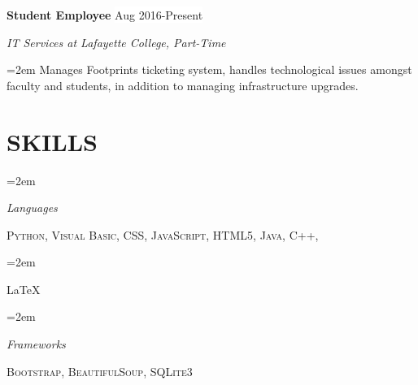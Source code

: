 \documentclass[paper=letter,fontsize=11pt]{scrartcl} %
\newlength{\spacebox}
\newcommand{\NewPart}[1]{\section*{\uppercase{#1}}}
\newcommand{\PersonalEntry}[2]{
		\noindent\hangindent=2em\hangafter=0 %
		\parbox{\spacebox}{        %
		\textit{#1}}		       %
		\hspace{1.5em} #2 \par}    %
\newcommand{\SkillsEntry}[2]{      %
		\noindent\hangindent=2em\hangafter=0 %
		\parbox{\spacebox}{        %
		\textit{#1}}			   %
		\hspace{1.5em} #2 \par}    %
\newcommand{\EducationEntry}[4]{
		\noindent \textbf{#1} \hfill      %
		\colorbox{White}{%
			\parbox{6em}{%
			\hfill\color{Black}#2}} \par  %
		\noindent \textit{#3} \par        %
		\noindent\hangindent=2em\hangafter=0 \small #4 %
		\normalsize \par}
\newcommand{\WorkEntry}[4]{				  %
		\noindent \textbf{#1} \hfill      %
		\colorbox{White}{\color{Black}#2} \par  %
		\noindent \textit{#3} \par              %
		\noindent\hangindent=2em\hangafter=0 \small #4 %
		\normalsize \par}
\begin{document}
\WorkEntry{Student Employee}{Aug 2016-Present}{IT Services at Lafayette College, Part-Time}{Manages Footprints ticketing system, handles technological issues amongst faculty and students, in addition to managing infrastructure upgrades.}

\NewPart{Skills}{}

\SkillsEntry{Languages}{\textsc{Python}, \textsc{Visual Basic}, \textsc{CSS}, \textsc{JavaScript}, \textsc{HTML5}, \textsc{Java}, \textsc{C++},}
\SkillsEntry{ }{\LaTeX}
\SkillsEntry{Frameworks}{\textsc{Bootstrap}, \textsc{BeautifulSoup}, \textsc{SQLite3}}


\end{document}
